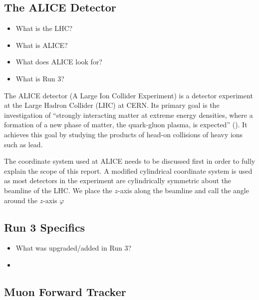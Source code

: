 \subsection{The ALICE Detector}
\begin{itemize}
    \item What is the LHC?
    \item What is ALICE?
    \item What does ALICE look for?
    \item What is Run 3?
\end{itemize}
The ALICE detector (A Large Ion Collider Experiment) is a detector experiment at the Large Hadron Collider (LHC) at CERN. Its primary goal is the investigation of ``strongly interacting matter at extreme energy densities, where a formation of a new phase of matter, the quark-gluon plasma, is expected'' (\cite{ALICE_LOI}). It achieves this goal by studying the products of head-on collisions of heavy ions such as lead. 



The coordinate system used at ALICE needs to be discussed first in order to fully explain the scope of this report. A modified cylindrical coordinate system is used as most detectors in the experiment are cylindrically symmetric about the beamline of the LHC. We place the $z$-axis along the beamline and call the angle around the $z$-axis $\varphi$



\subsection{Run 3 Specifics}
\begin{itemize}
    \item What was upgraded/added in Run 3?
    \item 
\end{itemize}

\subsection{Muon Forward Tracker}